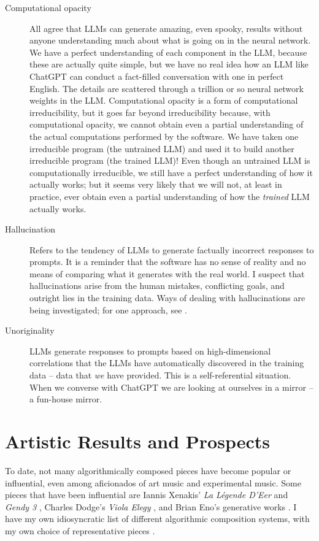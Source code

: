 \documentclass[11pt,papersize=a4]{scrartcl}
\begin{document}
\begin{description}
\item[Computational opacity] All agree that LLMs can generate amazing, even spooky, results without anyone understanding much about what is going on in the neural network. We have a perfect understanding of each component in the LLM, because these are actually quite simple, but we have no real idea how an LLM like ChatGPT can conduct a fact-filled conversation with one in perfect English. The details are scattered through a trillion or so neural network weights in the LLM. Computational opacity is a form of computational irreducibility, but it goes far beyond irreducibility because, with computational opacity, we cannot obtain even a partial understanding of the actual computations performed by the software. We have taken one irreducible program (the untrained LLM) and used it to build another irreducible program (the trained LLM)! Even though an untrained LLM is computationally irreducible, we still have a perfect understanding of how it actually works; but it seems very likely that we will not, at least in practice, ever obtain even a partial understanding of how the \emph{trained} LLM actually works.
\item [Hallucination] Refers to the tendency of LLMs to generate factually incorrect responses to prompts. It is a reminder that the software has no sense of reality and no means of comparing what it generates with the real world. I suspect that hallucinations arise from the human mistakes, conflicting goals, and outright lies in the training data. Ways of dealing with hallucinations are being investigated; for one approach, see \parencite{christiano2017deep}.
\item [Unoriginality] LLMs generate responses to prompts based on high-dimensional correlations that the LLMs have automatically discovered in the training data -- data that \emph{we} have provided. This is a self-referential situation. When we converse with ChatGPT we are looking at ourselves in a mirror -- a fun-house mirror.
\end{description}

\section*{Artistic Results and Prospects}

To date, not many algorithmically composed pieces have become popular or influential, even among aficionados of art music and experimental music. Some pieces that have been influential are Iannis Xenakis' \emph{La Légende D'Eer} \parencite{Solr-8143160} and \emph{Gendy 3} \parencite{gendy3},  Charles Dodge's \emph{Viola Elegy} \parencite{violaelegy}, and Brian Eno's generative works \parencite{eno1996generative, enochilvers}. I have my own idiosyncratic list of different algorithmic composition systems, with my own choice of representative pieces \parencite{rant}.
\end{document}
